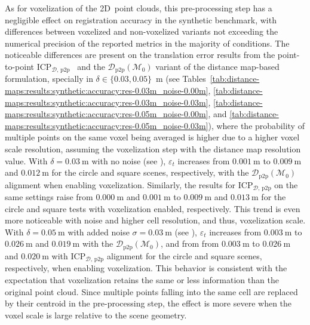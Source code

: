 As for voxelization of the 2D~point clouds, this pre-processing step has a
negligible effect on registration accuracy in the synthetic benchmark,
with differences between voxelized and non-voxelized variants not exceeding the
numerical precision of the reported metrics in the majority of conditions.
The noticeable differences are present on the translation error results from
the point-to-point
$\mathrm{ICP}_{\mathcal{D},\,\mathrm{p2p}}$~\cite{besl-mckay:tpami:1992} and
the $\mathcal{D}_\mathrm{p2p}(\mathcal{M}_0)$ variant of the distance map-based
formulation, specially in $\delta \in\{0.03, 0.05\}$~m
(see Tables~\ref{tab:distance-maps:results:synthetic:accuracy:res-0.03m_noise-0.00m},
\ref{tab:distance-maps:results:synthetic:accuracy:res-0.03m_noise-0.03m},
\ref{tab:distance-maps:results:synthetic:accuracy:res-0.05m_noise-0.00m}, and
\ref{tab:distance-maps:results:synthetic:accuracy:res-0.05m_noise-0.03m}),
where the probability of multiple points on the same voxel being averaged is
higher due to a higher voxel scale resolution, assuming the voxelization step
with the distance map resolution value.
With $\delta = \SI{0.03}{\metre}$ with no noise (see
),
$\varepsilon_t$ increases from $\SI{0.001}{\metre}$
to $\SI{0.009}{\metre}$ and $\SI{0.012}{\metre}$ for the circle and square
scenes, respectively, with the $\mathcal{D}_\mathrm{p2p}(\mathcal{M}_0)$
alignment when enabling voxelization.
Similarly, the results for $\mathrm{ICP}_{\mathcal{D},\,\mathrm{p2p}}$ on the
same settings raise from $\SI{0.000}{\metre}$ and $\SI{0.001}{\metre}$ to
$\SI{0.009}{\metre}$ and $\SI{0.013}{\metre}$ for the circle and square tests
with voxelization enabled, respectively.
This trend is even more noticeable with noise and higher cell resolution, and thus,
voxelization scale.
With $\delta = \SI{0.05}{\metre}$ with added noise $\sigma = \SI{0.03}{\metre}$
(see ),
$\varepsilon_t$ increases from $\SI{0.003}{\metre}$ to
$\SI{0.026}{\metre}$ and $\SI{0.019}{\metre}$ with the
$\mathcal{D}_\mathrm{p2p}(\mathcal{M}_0)$, and from
from $\SI{0.003}{\metre}$ to $\SI{0.026}{\metre}$ and
$\SI{0.020}{\metre}$ with $\mathrm{ICP}_{\mathcal{D},\,\mathrm{p2p}}$ alignment
for the circle and square scenes, respectively, when enabling voxelization.
This behavior is consistent with the expectation that voxelization retains
the same or less information than the original point cloud. Since multiple
points falling into the same cell are replaced by their centroid in the
pre-processing step, the effect is more severe when the voxel scale is large
relative to the scene geometry.

